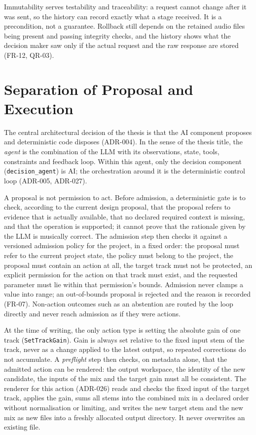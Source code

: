 Immutability serves testability and traceability: a request cannot change after it was sent, so the history can record exactly what a stage received. It is a precondition, not a guarantee. Rollback still depends on the retained audio files being present and passing integrity checks, and the history shows what the decision maker saw only if the actual request and the raw response are stored (FR-12, QR-03).

\section{Separation of Proposal and Execution}
\label{sec:arch-proposal}

The central architectural decision of the thesis is that the \ac{AI} component proposes and deterministic code disposes (ADR-004). In the sense of the thesis title, the \emph{agent} is the combination of the \ac{LLM} with its observations, state, tools, constraints and feedback loop. Within this agent, only the decision component (\texttt{decision\_agent}) is \ac{AI}; the orchestration around it is the deterministic control loop (ADR-005, ADR-027).

A proposal is not permission to act. Before admission, a deterministic gate is to check, according to the current design proposal, that the proposal refers to evidence that is actually available, that no declared required context is missing, and that the operation is supported; it cannot prove that the rationale given by the \ac{LLM} is musically correct. The admission step then checks it against a versioned admission policy for the project, in a fixed order: the proposal must refer to the current project state, the policy must belong to the project, the proposal must contain an action at all, the target track must not be protected, an explicit permission for the action on that track must exist, and the requested parameter must lie within that permission's bounds. Admission never clamps a value into range; an out-of-bounds proposal is rejected and the reason is recorded (FR-07). Non-action outcomes such as an abstention are routed by the loop directly and never reach admission as if they were actions.

At the time of writing, the only action type is setting the absolute gain of one track (\texttt{SetTrackGain}). Gain is always set relative to the fixed input stem of the track, never as a change applied to the latest output, so repeated corrections do not accumulate. A \emph{preflight} step then checks, on metadata alone, that the admitted action can be rendered: the output workspace, the identity of the new candidate, the inputs of the mix and the target gain must all be consistent. The renderer for this action (ADR-026) reads and checks the fixed input of the target track, applies the gain, sums all stems into the combined mix in a declared order without normalisation or limiting, and writes the new target stem and the new mix as new files into a freshly allocated output directory. It never overwrites an existing file.

